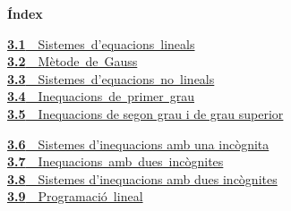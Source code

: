 \documentclass[11pt,a4paper]{article}
\begin{document}
\begin{tcolorbox}[colback=fmsurface,colframe=fmsurface,arc=3mm,left=4mm,right=4mm,top=2mm,bottom=2mm]
\small\textbf{Índex}\par\smallskip
\begin{minipage}[t]{0.49\linewidth}\small \mbox{\hyperlink{sec1}{\textbf{\color{fmgreen}3.1}\ \ Sistemes d'equacions lineals}}\\[3pt]
\mbox{\hyperlink{sec2}{\textbf{\color{fmgreen}3.2}\ \ Mètode de Gauss}}\\[3pt]
\mbox{\hyperlink{sec3}{\textbf{\color{fmgreen}3.3}\ \ Sistemes d'equacions no lineals}}\\[3pt]
\mbox{\hyperlink{sec4}{\textbf{\color{fmgreen}3.4}\ \ Inequacions de primer grau}}\\[3pt]
\hyperlink{sec5}{\textbf{\color{fmgreen}3.5}\ \ Inequacions de segon grau i de grau superior}\\[3pt]\end{minipage}\hfill\begin{minipage}[t]{0.49\linewidth}\small \hyperlink{sec6}{\textbf{\color{fmgreen}3.6}\ \ Sistemes d'inequacions amb una incògnita}\\[3pt]
\mbox{\hyperlink{sec7}{\textbf{\color{fmgreen}3.7}\ \ Inequacions amb dues incògnites}}\\[3pt]
\hyperlink{sec8}{\textbf{\color{fmgreen}3.8}\ \ Sistemes d'inequacions amb dues incògnites}\\[3pt]
\mbox{\hyperlink{sec9}{\textbf{\color{fmgreen}3.9}\ \ Programació lineal}}\\[3pt]\end{minipage}
\end{tcolorbox}

\Needspace{5.7cm}
\end{document}
